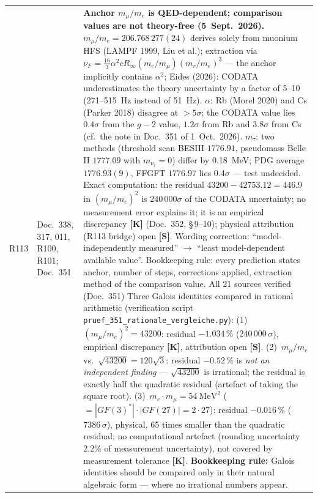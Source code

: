 \begin{longtable}{@{}p{0.9cm}p{3.1cm}p{10.2cm}@{}}
R113 & Doc.~338, 317, 011, R100, R101; Doc.~351 & \textbf{Anchor $m_\mu/m_e$ is QED-dependent; comparison values are not theory-free \QM{} (5~Sept.~2026).} $m_\mu/m_e=206.768\,277(24)$ derives solely from muonium HFS (LAMPF 1999, Liu et al.); extraction via $\nu_F=\tfrac{16}{3}\alpha^2cR_\infty(m_e/m_\mu)(m_r/m_e)^3$ --- the anchor implicitly contains $\alpha^2$; Eides (2026): CODATA underestimates the theory uncertainty by a factor of 5--10 (271--515~Hz instead of 51~Hz). $\alpha$: Rb (Morel 2020) and Cs (Parker 2018) disagree at $>5\sigma$; the CODATA value lies $0.4\sigma$ from the $g-2$ value, $1.2\sigma$ from Rb and $3.8\sigma$ from Cs (cf.\ the note in Doc.~351 of 1~Oct.~2026). $m_\tau$: two methods (threshold scan BESIII $1776.91$, pseudomass Belle II $1777.09$ with $m_{\nu_\tau}=0$) differ by 0.18~MeV; PDG average $1776.93(9)$, FFGFT $1776.97$ lies $0.4\sigma$ --- test undecided. Exact computation: the residual $43200-42753.12=446.9$ in $(m_\mu/m_e)^2$ is $240\,000\sigma$ of the CODATA uncertainty; no measurement error explains it; it is an empirical discrepancy \textbf{[K]} (Doc.~352, §\,9--10); physical attribution (R113 bridge) open \textbf{[S]}. Wording correction: ``model-independently measured'' $\to$ ``least model-dependent available value''. Bookkeeping rule: every prediction states anchor, number of steps, corrections applied, extraction method of the comparison value. All 21 sources verified (Doc.~351) Three Galois identities compared in rational arithmetic (verification script \texttt{pruef\_351\_rationale\_vergleiche.py}): (1)~$(m_\mu/m_e)^2=43200$: residual $-1.034\,\%$ ($240\,000\,\sigma$), empirical discrepancy \textbf{[K]}, attribution open \textbf{[S]}. (2)~$m_\mu/m_e$ vs.\ $\sqrt{43200}=120\sqrt{3}$: residual $-0.52\,\%$ is \emph{not an independent finding} --- $\sqrt{43200}$ is irrational; the residual is exactly half the quadratic residual (artefact of taking the square root). (3)~$m_e\cdot m_\mu=54~\text{MeV}^2$ ($=|GF(3)^*|\cdot|GF(27)|=2\cdot27$): residual $-0.016\,\%$ ($7386\,\sigma$), physical, 65 times smaller than the quadratic residual; no computational artefact (rounding uncertainty 2.2\% of measurement uncertainty), not covered by measurement tolerance \textbf{[K]}. \textbf{Bookkeeping rule:} Galois identities should be compared only in their natural algebraic form --- where no irrational numbers appear. \\

\end{longtable}
